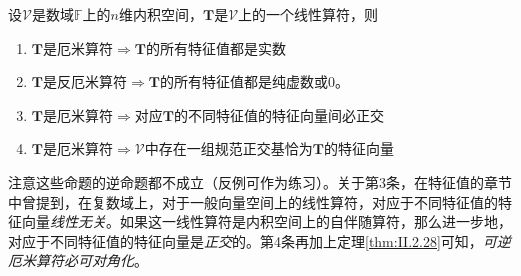\documentclass[main.tex]{subfiles}
\begin{document}
\begin{theorem}\label{thm:II.2.32}
    设$\mathcal{V}$是数域$\mathbb{F}$上的$n$维内积空间，$\mathbf{T}$是$\mathcal{V}$上的一个线性算符，则
    \begin{enumerate}
        \item $\mathbf{T}$是厄米算符$\Rightarrow\mathbf{T}$的所有特征值都是实数
        \item $\mathbf{T}$是反厄米算符$\Rightarrow\mathbf{T}$的所有特征值都是纯虚数或0。
        \item $\mathbf{T}$是厄米算符$\Rightarrow$对应$\mathbf{T}$的不同特征值的特征向量间必正交
        \item $\mathbf{T}$是厄米算符$\Rightarrow\mathcal{V}$中存在一组规范正交基恰为$\mathbf{T}$的特征向量
    \end{enumerate}
\end{theorem}

注意这些命题的逆命题都不成立（反例可作为练习）。关于第3条，在特征值的章节中曾提到，在复数域上，对于一般向量空间上的线性算符，对应于不同特征值的特征向量\emph{线性无关}。如果这一线性算符是内积空间上的自伴随算符，那么进一步地，对应于不同特征值的特征向量是\emph{正交}的。第4条再加上定理\ref{thm:II.2.28}可知，\emph{可逆厄米算符必可对角化}。
\end{document}
